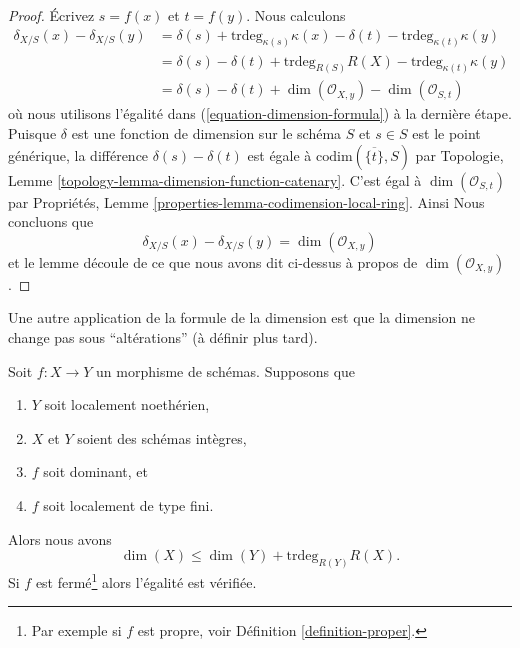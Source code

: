 \begin{proof}
\medskip\noindent Écrivez
$s = f(x)$ et $t = f(y)$. Nous calculons
\begin{align*}
\delta_{X/S}(x) - \delta_{X/S}(y)
& =
\delta(s) + \text{trdeg}_{\kappa(s)} \kappa(x)
- \delta(t) - \text{trdeg}_{\kappa(t)} \kappa(y) \\
& =
\delta(s) - \delta(t) +
\text{trdeg}_{R(S)} R(X) - \text{trdeg}_{\kappa(t)} \kappa(y) \\
& =
\delta(s) - \delta(t) + \dim(\mathcal{O}_{X, y})
- \dim(\mathcal{O}_{S, t})
\end{align*}
où nous utilisons l'égalité dans (\ref{equation-dimension-formula}) à
la dernière étape. Puisque $\delta$ est une fonction
de dimension sur le schéma $S$
et $s \in S$ est le point générique, la différence $\delta(s) - \delta(t)$
est égale à $\text{codim}(\overline{\{t\}}, S)$ par Topologie, Lemme
\ref{topology-lemma-dimension-function-catenary}. C'est égal à $\dim(\mathcal{O}_{S, t})$
par Propriétés,
Lemme \ref{properties-lemma-codimension-local-ring}. Ainsi Nous
concluons que
$$
\delta_{X/S}(x) - \delta_{X/S}(y) = \dim(\mathcal{O}_{X, y})
$$
et le lemme découle de ce que nous avons dit ci-dessus à propos de $\dim(\mathcal{O}_{X, y})$.
\end{proof}

\noindent
Une autre application de la formule de la dimension est que la dimension ne change pas sous
``altérations'' (à définir plus tard).

\begin{lemma}
\label{lemma-alteration-dimension}
Soit $f : X \to Y$ un morphisme de schémas. Supposons que
\begin{enumerate}
\item $Y$ soit localement noethérien,
\item $X$ et $Y$ soient des schémas intègres,
\item $f$ soit dominant, et
\item $f$ soit localement de type fini.
\end{enumerate}
Alors nous avons
$$
\dim(X) \leq \dim(Y) + \text{trdeg}_{R(Y)} R(X).
$$
Si $f$ est fermé\footnote{Par exemple si $f$ est propre,
voir Définition \ref{definition-proper}.} alors l'égalité est vérifiée.
\end{lemma}

